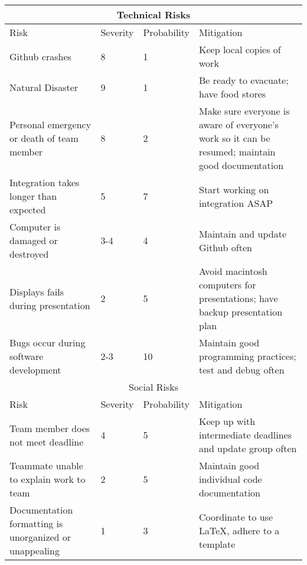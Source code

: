 \documentclass{scrreprt}
\begin{document}
\begin{tabular}{ |p{4cm}||p{2cm}|p{2cm}|p{4cm}|  }
    \hline
    \multicolumn{4}{|c|}{Technical Risks} \\
    \hline
    Risk & Severity & Probability & Mitigation\\
    \hline
    \hline
    Github crashes & 8 & 1 & Keep local copies of work\\
    \hline
    Natural Disaster & 9 & 1 & Be ready to evacuate; have food stores\\
    \hline
    Personal emergency or death of team member & 8 & 2 & Make sure everyone is aware of everyone's work so it can be resumed; maintain good documentation\\
    \hline
    Integration takes longer than expected & 5 & 7 & Start working on integration ASAP\\
    \hline
    Computer is damaged or destroyed & 3-4 & 4 & Maintain and update Github often\\
    \hline
    Displays fails during presentation & 2 & 5 & Avoid macintosh computers for presentations; have backup presentation plan\\
    \hline
    Bugs occur during software development & 2-3 & 10 & Maintain good programming practices; test and debug often\\
    \hline
    \hline
    \hline
    \multicolumn{4}{|c|}{Social Risks} \\
    \hline
    Risk & Severity & Probability & Mitigation\\
    \hline
    \hline
    Team member does not meet deadline & 4 & 5 & Keep up with intermediate deadlines and update group often\\
    \hline
    Teammate unable to explain work to team & 2 & 5 & Maintain good individual code documentation\\
    \hline
    Documentation formatting is unorganized or unappealing & 1 & 3 & Coordinate to use LaTeX, adhere to a template\\
    \hline
\end{tabular}
\end{document}
